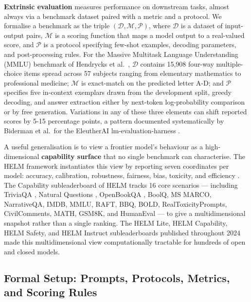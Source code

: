 \documentclass{article}
\begin{document}
\textbf{Extrinsic evaluation} measures performance on downstream tasks, almost always via a benchmark dataset paired with a metric and a protocol. We formalise a benchmark as the triple \((\mathcal{D}, \mathcal{M}, \mathcal{P})\), where \(\mathcal{D}\) is a dataset of input-output pairs, \(\mathcal{M}\) is a scoring function that maps a model output to a real-valued score, and \(\mathcal{P}\) is a protocol specifying few-shot examples, decoding parameters, and post-processing rules. For the Massive Multitask Language Understanding (MMLU) benchmark of Hendrycks et al.~\cite{hendrycks2021measuringmassivemu}, \(\mathcal{D}\) contains 15,908 four-way multiple-choice items spread across 57 subjects ranging from elementary mathematics to professional medicine; \(\mathcal{M}\) is exact-match on the predicted letter A-D; and \(\mathcal{P}\) specifies five in-context exemplars drawn from the development split, greedy decoding, and answer extraction either by next-token log-probability comparison or by free generation. Variations in any of these three elements can shift reported scores by 5-15 percentage points, a pattern documented systematically by Biderman et al.~for the EleutherAI lm-evaluation-harness \cite{biderman20242024}.

A useful generalisation is to view a frontier model's behaviour as a high-dimensional \textbf{capability surface} that no single benchmark can characterise. The HELM framework instantiates this view by reporting seven coordinates per model: accuracy, calibration, robustness, fairness, bias, toxicity, and efficiency \cite{liang20222022,bommasani2023holisticevaluation}. The Capability subleaderboard of HELM tracks 16 core scenarios --- including TriviaQA \cite{joshi2017triviaqaalargescal}, Natural Questions \cite{kwiatkowski20192019}, OpenBookQA \cite{mihaylov2018canasuitofarmorcon}, BoolQ, MS MARCO, NarrativeQA, IMDB, MMLU, RAFT, BBQ, BOLD, RealToxicityPrompts, CivilComments, MATH, GSM8K, and HumanEval --- to give a multidimensional snapshot rather than a single ranking. The HELM Lite, HELM Capability, HELM Safety, and HELM Instruct subleaderboards published throughout 2024 made this multidimensional view computationally tractable for hundreds of open and closed models.

\subsection{Formal Setup: Prompts, Protocols, Metrics, and Scoring Rules}\label{formal-setup-prompts-protocols-metrics-and-scoring-rules}
\end{document}
